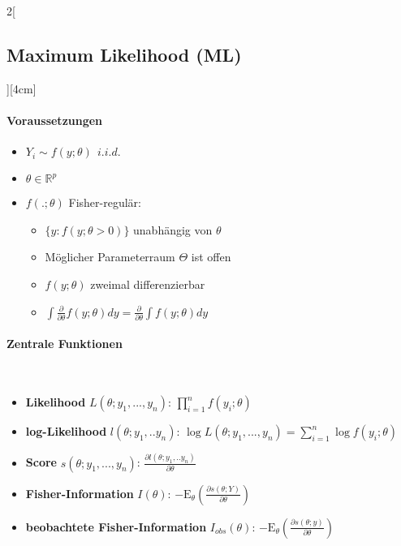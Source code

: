 \documentclass[8pt]{extarticle}
\begin{document}
\begin{multicols}{2}[\subsection{Maximum Likelihood (ML)}][4cm]
  \paragraph{Voraussetzungen}
  
  \begin{itemize}
  \item $Y_i \sim f(y;\theta)\:\: i.i.d.$
  \item $\theta \in \mathbb{R}^p$
  \item $f(.;\theta)$ Fisher-regulär:
  \begin{itemize}
  \item $\{ y: f (y; \theta > 0) \}$ unabhängig von $\theta$
  \item Möglicher Parameterraum $\Theta$ ist offen
  \item $f(y;\theta)$ zweimal differenzierbar
  \item $\int \frac{\partial}{\partial \theta} f(y;\theta)dy = \frac{\partial}{\partial \theta} \int f(y;\theta)dy$
  \end{itemize}
  \end{itemize}
  
  \paragraph{Zentrale Funktionen} \ \\
  \begin{itemize}
  \item \textbf{Likelihood} $L(\theta;y_1,...,y_n)$: $\prod_{i=1}^n f(y_i;\theta)$
  \item \textbf{log-Likelihood} $l(\theta;y_1,..y_n)$: 
$\log L(\theta;y_1,...,y_n) = \sum_{i=1}^n \log f(y_i;\theta)$
  \item \textbf{Score} $s(\theta;y_1,...,y_n)$: $\frac{\partial l(\theta;y_1,..y_n)}{\partial \theta}$
  \item \textbf{Fisher-Information} $I(\theta)$: $-\mathrm{E}_\theta\left(\frac{\partial s(\theta;Y)}{\partial\theta}\right)$
  \item \textbf{beobachtete Fisher-Information} $I_{obs}(\theta)$: $-\mathrm{E}_\theta\left(\frac{\partial s(\theta;y)}{\partial\theta}\right)$
  \end{itemize}
  

\end{multicols}
\end{document}
